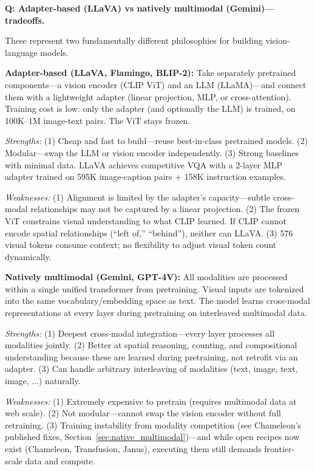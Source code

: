 
\begin{interviewq}
\textbf{Q: Adapter-based (LLaVA) vs natively multimodal (Gemini)---tradeoffs.}

 \quad {} \quad \badgefreq{\freqhigh}

\stronganswer

These represent two fundamentally different philosophies for building vision-language models.

\textbf{Adapter-based (LLaVA, Flamingo, BLIP-2):} Take separately pretrained components---a vision encoder (CLIP ViT) and an LLM (LLaMA)---and connect them with a lightweight adapter (linear projection, MLP, or cross-attention). Training cost is low: only the adapter (and optionally the LLM) is trained, on 100K--1M image-text pairs. The ViT stays frozen.

\textit{Strengths:} (1) Cheap and fast to build---reuse best-in-class pretrained models. (2) Modular---swap the LLM or vision encoder independently. (3) Strong baselines with minimal data. LLaVA achieves competitive VQA with a 2-layer MLP adapter trained on 595K image-caption pairs + 158K instruction examples.

\textit{Weaknesses:} (1) Alignment is limited by the adapter's capacity---subtle cross-modal relationships may not be captured by a linear projection. (2) The frozen ViT constrains visual understanding to what CLIP learned. If CLIP cannot encode spatial relationships (``left of,'' ``behind''), neither can LLaVA. (3) 576 visual tokens consume context; no flexibility to adjust visual token count dynamically.

\textbf{Natively multimodal (Gemini, GPT-4V):} All modalities are processed within a single unified transformer from pretraining. Visual inputs are tokenized into the same vocabulary/embedding space as text. The model learns cross-modal representations at every layer during pretraining on interleaved multimodal data.

\textit{Strengths:} (1) Deepest cross-modal integration---every layer processes all modalities jointly. (2) Better at spatial reasoning, counting, and compositional understanding because these are learned during pretraining, not retrofit via an adapter. (3) Can handle arbitrary interleaving of modalities (text, image, text, image, ...) naturally.

\textit{Weaknesses:} (1) Extremely expensive to pretrain (requires multimodal data at web scale). (2) Not modular---cannot swap the vision encoder without full retraining. (3) Training instability from modality competition (see Chameleon's published fixes, Section~\ref{sec:native_multimodal})---and while open recipes now exist (Chameleon, Transfusion, Janus), executing them still demands frontier-scale data and compute.


\end{interviewq}
